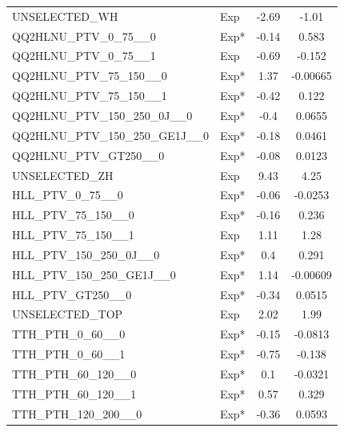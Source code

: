 \begin{table}[!h]
{\begin{tabular}{llcc}
			UNSELECTED\_WH                                              & Exp &-2.69&-1.01\\
			QQ2HLNU\_PTV\_0\_75\_\_0                                    & Exp* &-0.14&0.583\\
			QQ2HLNU\_PTV\_0\_75\_\_1                                    & Exp &-0.69&-0.152\\
			QQ2HLNU\_PTV\_75\_150\_\_0                                  & Exp* &1.37&-0.00665\\
			QQ2HLNU\_PTV\_75\_150\_\_1                                  & Exp* &-0.42&0.122\\
			QQ2HLNU\_PTV\_150\_250\_0J\_\_0                             & Exp* &-0.4&0.0655\\
			QQ2HLNU\_PTV\_150\_250\_GE1J\_\_0                           & Exp* &-0.18&0.0461\\
			QQ2HLNU\_PTV\_GT250\_\_0                                    & Exp* &-0.08&0.0123\\
			UNSELECTED\_ZH                                              & Exp &9.43&4.25\\
			HLL\_PTV\_0\_75\_\_0                                        & Exp* &-0.06&-0.0253\\
			HLL\_PTV\_75\_150\_\_0                                      & Exp* &-0.16&0.236\\
			HLL\_PTV\_75\_150\_\_1                                      & Exp &1.11&1.28\\
			HLL\_PTV\_150\_250\_0J\_\_0                                 & Exp* &0.4&0.291\\
			HLL\_PTV\_150\_250\_GE1J\_\_0                               & Exp* &1.14&-0.00609\\
			HLL\_PTV\_GT250\_\_0                                        & Exp* &-0.34&0.0515\\
			UNSELECTED\_TOP                                             & Exp &2.02&1.99\\
			TTH\_PTH\_0\_60\_\_0                                        & Exp* &-0.15&-0.0813\\
			TTH\_PTH\_0\_60\_\_1                                        & Exp* &-0.75&-0.138\\
			TTH\_PTH\_60\_120\_\_0                                      & Exp* &0.1&-0.0321\\
			TTH\_PTH\_60\_120\_\_1                                      & Exp* &0.57&0.329\\
			TTH\_PTH\_120\_200\_\_0                                     & Exp* &-0.36&0.0593\\

\end{tabular}}
\end{table}
